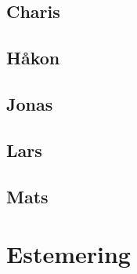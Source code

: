 \documentclass[12pt]{article}
\begin{document}
\subsection{Charis}

\subsection{Håkon}

\subsection{Jonas}

\subsection{Lars}

\subsection{Mats}

\section{Estemering}
\end{document}

